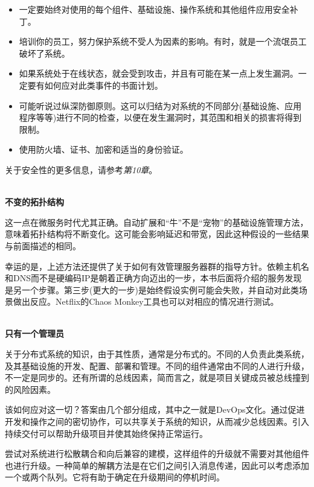 \begin{itemize}
\item 
一定要始终对使用的每个组件、基础设施、操作系统和其他组件应用安全补丁。

\item 
培训你的员工，努力保护系统不受人为因素的影响。有时，就是一个流氓员工破坏了系统。

\item 
如果系统处于在线状态，就会受到攻击，并且有可能在某一点上发生漏洞。一定要有如何应对此类事件的书面计划。

\item 
可能听说过纵深防御原则。这可以归结为对系统的不同部分(基础设施、应用程序等等)进行不同的检查，以便在发生漏洞时，其范围和相关的损害将得到限制。

\item 
使用防火墙、证书、加密和适当的身份验证。
\end{itemize}

关于安全性的更多信息，请参考\textit{第10章}。

\hspace*{\fill} \\ %
\noindent
\textbf{不变的拓扑结构}

这一点在微服务时代尤其正确。自动扩展和“牛”不是“宠物”的基础设施管理方法，意味着拓扑结构将不断变化。这可能会影响延迟和带宽，因此这种假设的一些结果与前面描述的相同。

幸运的是，上述方法还提供了关于如何有效管理服务器群的指导方针。依赖主机名和DNS而不是硬编码IP是朝着正确方向迈出的一步，本书后面将介绍的服务发现是另一个步骤。第三步(更大的一步)是始终假设实例可能会失败，并自动对此类场景做出反应。Netflix的Chaos Monkey工具也可以对相应的情况进行测试。

\hspace*{\fill} \\ %
\noindent
\textbf{只有一个管理员}

关于分布式系统的知识，由于其性质，通常是分布式的。不同的人负责此类系统，及其基础设施的开发、配置、部署和管理。不同的组件通常由不同的人进行升级，不一定是同步的。还有所谓的总线因素，简而言之，就是项目关键成员被总线撞到的风险因素。

该如何应对这一切？答案由几个部分组成，其中之一就是DevOps文化。通过促进开发和操作之间的密切协作，可以共享关于系统的知识，从而减少总线因素。引入持续交付可以帮助升级项目并使其始终保持正常运行。

尝试对系统进行松散耦合和向后兼容的建模，这样组件的升级就不需要对其他组件也进行升级。一种简单的解耦方法是在它们之间引入消息传递，因此可以考虑添加一个或两个队列。它将有助于确定在升级期间的停机时间。

